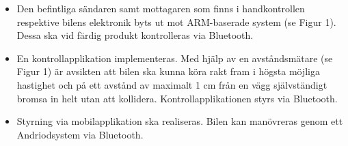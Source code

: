 \documentclass[a4paper]{article}
\begin{document}
\begin{itemize}
\item Den befintliga sändaren samt mottagaren som finns i handkontrollen respektive bilens elektronik byts ut mot ARM-baserade system (se Figur 1). Dessa ska vid färdig produkt kontrolleras via Bluetooth.
\item En kontrollapplikation implementeras. Med hjälp av en avståndsmätare (se Figur 1) är avsikten att bilen ska kunna köra rakt fram i högsta möjliga hastighet och på ett avstånd av maximalt 1 cm från en vägg självständigt bromsa in helt utan att kollidera. Kontrollapplikationen styrs via Bluetooth.
\item Styrning via mobilapplikation ska realiseras. Bilen kan manövreras genom ett Andriodsystem via Bluetooth.
\end{itemize}
\end{document}
